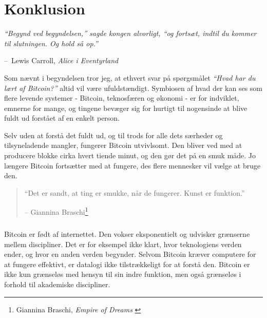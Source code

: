\documentclass[paper=6in:9in,pagesize=pdftex,
               headinclude=on,footinclude=on,12pt]{scrbook}
\makeatletter
\newenvironment{chapquote}[2][4em]{\setlength{\@tempdima}{#1}%
   \def\chapquote@author{#2}%
   \parshape 1 \@tempdima \dimexpr\textwidth-2\@tempdima\relax%
   \itshape}{\par\normalfont\hfill--\ \chapquote@author\hspace*{\@tempdima}\par\bigskip}
\makeatother
\begin{document}
\label{ch:conclusion}

\chapter*{Konklusion}

\begin{chapquote}{Lewis Carroll, \textit{Alice i Eventyrland}} \enquote{Begynd ved begyndelsen,} sagde kongen alvorligt, \enquote{og fortsæt, indtil du kommer til slutningen. Og hold så op.} \end{chapquote}

Som nævnt i begyndelsen tror jeg, at ethvert svar på spørgsmålet \textit{\enquote{Hvad har du lært af Bitcoin?}} altid vil være ufuldstændigt. Symbiosen af hvad der kan ses som flere levende systemer - Bitcoin, teknosfæren og økonomi - er for indviklet, emnerne for mange, og tingene bevæger sig for hurtigt til nogensinde at blive fuldt ud forstået af en enkelt person.

Selv uden at forstå det fuldt ud, og til trods for alle dets særheder og tilsyneladende mangler, fungerer Bitcoin utvivlsomt. Den bliver ved med at producere blokke cirka hvert tiende minut, og den gør det på en smuk måde. Jo længere Bitcoin fortsætter med at fungere, des flere mennesker vil vælge at bruge den.\begin{quotation}\begin{samepage} \enquote{Det er sandt, at ting er smukke, når de fungerer. Kunst er funktion.} \begin{flushright} -- Giannina Braschi\footnote{Giannina Braschi, \textit{Empire of Dreams} \cite{braschi2011empire}}
\end{flushright}\end{samepage}\end{quotation}

\paragraph{} Bitcoin er født af internettet. Den vokser eksponentielt og udvisker grænserne mellem discipliner. Det er for eksempel ikke klart, hvor teknologiens verden ender, og hvor en anden verden begynder. Selvom Bitcoin kræver computere for at fungere effektivt, er datalogi ikke tilstrækkeligt for at forstå den. Bitcoin er ikke kun grænseløs med hensyn til sin indre funktion, men også grænseløs i forhold til akademiske discipliner.
\end{document}
